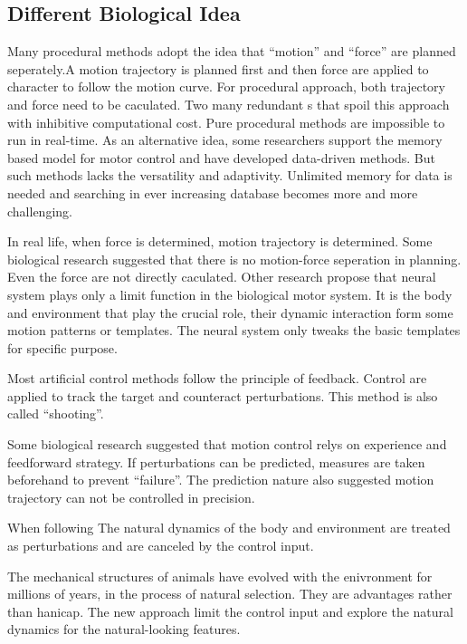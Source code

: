 \subsection{Different Biological Idea}
\begin{itemize}
Many procedural \cms methods adopt the idea that ``motion'' and ``force'' are planned seperately.A motion trajectory is planned first and then force are applied to character to follow the motion curve.
For procedural approach, both trajectory and force need to be caculated.
Two many redundant {\dof}s that spoil this approach  with inhibitive computational cost.
Pure procedural methods are impossible to run in real-time.
As an alternative idea, some researchers support the memory based model for motor control and have developed data-driven methods.
But such methods lacks the versatility and adaptivity.
Unlimited memory for data is needed and searching in ever increasing database becomes more and more challenging.



In real life, when force is determined, motion trajectory is determined.
Some biological research suggested that there is no motion-force seperation in planning.
Even the force are not directly caculated.
Other research propose that neural system plays only a limit function in the biological motor system.
It is the body and environment that play the crucial role, their dynamic interaction form some motion patterns or templates.
The neural system only tweaks the basic templates for specific purpose.



 
 
	
Most artificial control methods follow the principle of feedback.
Control are applied to track the target and counteract perturbations.
This method is also called ``shooting''.


Some biological research suggested that motion control relys on experience and feedforward strategy.
If perturbations can be predicted, measures are taken beforehand to prevent ``failure''.
The prediction nature also suggested motion trajectory can not be controlled in precision.
 


When following
The natural dynamics of the body and environment are treated as perturbations and are canceled by the control input.


The mechanical structures of animals have evolved with the enivronment for millions of years, in the process of natural selection.
They are advantages rather than hanicap. 
The new approach limit the control input and explore the natural dynamics for the natural-looking features.
\end{itemize}


